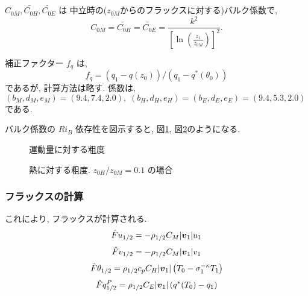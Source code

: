 $C_{0M}, \widetilde{C_{0H}}, \widetilde{C_{0E}}$ は
中立時の($z_{0M}$からのフラックスに対する)バルク係数で,
%
\begin{equation}
C_{0M}  =  \widetilde{C_{0H}}  =  \widetilde{C_{0E}}  = 
       \frac{k^2}{\left[\ln \left(\frac{z_1}{z_{0M}}\right)\right]^2 } .
\end{equation}

補正ファクター $f_q$ は, 
\begin{equation}
  f_q = (q_1 - q(z_0))/(q_1 - q^{\ast}(\theta_0))
\end{equation}
であるが, 計算方法は略す. 
係数は, $( b_M, d_M, e_M ) = ( 9.4, 7.4, 2.0 ), \;
( b_H, d_H, e_H ) = ( b_E, d_E, e_E ) = ( 9.4, 5.3, 2.0 )$ である. 

バルク係数の $Ri_B$ 依存性を図示すると,
図\ref{p-sflx:cm}, 図\ref{p-sflx:ch}のようになる.

\begin{figure}[htbp]
  \begin{center}
    \caption{運動量に対する粗度}
    \label{p-sflx:cm}
  \end{center}
\end{figure}
\begin{figure}[htbp]
  \begin{center}
    \caption{熱に対する粗度. $z_{0H}/z_{0M}=0.1$ の場合}
    \label{p-sflx:ch}
  \end{center}
\end{figure}

\subsubsection{フラックスの計算}

これにより, フラックスが計算される.
%
\begin{equation}
\hat{F}u_{1/2}  =  - \rho_{1/2} C_M |\Dvect{v}_1| u_1
\end{equation}
\begin{equation}
\hat{F}v_{1/2}  =  - \rho_{1/2} C_M |\Dvect{v}_1| v_1
\end{equation}
\begin{equation}
\hat{F}\theta_{1/2}  = \rho_{1/2} c_p C_H |\Dvect{v}_1| 
                    \left( T_0 - \sigma_1^{-\kappa} T_1 \right)
\end{equation}
\begin{equation}
\hat{F}q^P_{1/2}  =  \rho_{1/2} C_E |\Dvect{v}_1| 
                    \left( q^*(T_0) - q_1 \right)
\end{equation}

